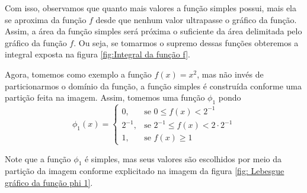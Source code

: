 Com isso, observamos que quanto mais valores a função simples possui, mais ela se aproxima da função $f$ desde que nenhum valor ultrapasse o gráfico da função.
Assim, a área da função simples será próxima o suficiente da área delimitada pelo gráfico da função $f$.
Ou seja, se tomarmos o supremo dessas funções obteremos a integral exposta na figura \ref{fig:Integral da função f}.
\begin{figure}[h!]
	\centering
\end{figure}

Agora, tomemos como exemplo a função $f(x) = x^2$, mas não invés de particionarmos o domínio da função, a função simples é construída conforme uma partição feita na imagem.
Assim, tomemos uma função $\phi_1$ pondo
$$
\phi_1(x) =\left\{
\begin{array}{ll}
	0, & \textrm{se\ } 0 \leq f(x) < 2^{-1} \\
	2^{-1}, & \textrm{se\ } 2^{-1} \leq f(x) < 2\cdot2^{-1} \\
	1, & \textrm{se\ } f(x) \geq 1
\end{array}
\right.
$$

Note que a função $\phi_1$ é simples, mas seus valores são escolhidos por meio da partição da imagem conforme explicitado na imagem da figura \ref{fig: Lebesgue gráfico da função phi 1}.

